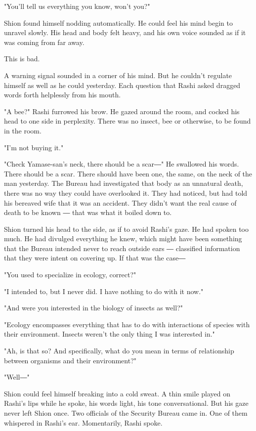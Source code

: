 "You'll tell us everything you know, won't you?"

Shion found himself nodding automatically. He could feel his mind begin
to unravel slowly. His head and body felt heavy, and his own voice
sounded as if it was coming from far away.

This is bad.

A warning signal sounded in a corner of his mind. But he couldn't
regulate himself as well as he could yesterday. Each question that Rashi
asked dragged words forth helplessly from his mouth.

"A bee?" Rashi furrowed his brow. He gazed around the room, and cocked
his head to one side in perplexity. There was no insect, bee or
otherwise, to be found in the room.

"I'm not buying it."

"Check Yamase-san's neck, there should be a scar―" He swallowed his
words. There should be a scar. There should have been one, the same, on
the neck of the man yesterday. The Bureau had investigated that body as
an unnatural death, there was no way they could have overlooked it. They
had noticed, but had told his bereaved wife that it was an accident.
They didn't want the real cause of death to be known ― that was what it
boiled down to.

Shion turned his head to the side, as if to avoid Rashi's gaze. He had
spoken too much. He had divulged everything he knew, which might have
been something that the Bureau intended never to reach outside ears ―
classified information that they were intent on covering up. If that was
the case―

"You used to specialize in ecology, correct?"

"I intended to, but I never did. I have nothing to do with it now."

"And were you interested in the biology of insects as well?"

"Ecology encompasses everything that has to do with interactions of
species with their environment. Insects weren't the only thing I was
interested in."

"Ah, is that so? And specifically, what do you mean in terms of
relationship between organisms and their environment?"

"Well―"

Shion could feel himself breaking into a cold sweat. A thin smile played
on Rashi's lips while he spoke, his words light, his tone
conversational. But his gaze never left Shion once. Two officials of the
Security Bureau came in. One of them whispered in Rashi's ear.
Momentarily, Rashi spoke.


